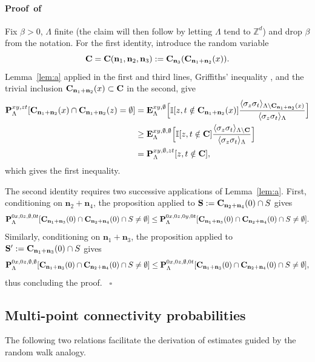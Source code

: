 \documentclass[a4paper,oneside,11pt]{article}
\def\Z{\mathbb{Z}}                          %
\newcommand{\be}[1]{\begin{equation}\label{#1}}
\newcommand{\ee}{\end{equation}}
\numberwithin{equation}{section}
\numberwithin{equation}{section}
\numberwithin{equation}{section}
\newenvironment{proof}[1][\relax]%
  {\paragraph{Proof\ifx#1\relax\else~of #1\fi}}%
  {~\hfill$\square$\par\bigskip}
\def\Z{\mathbb{Z}}                          %
\def\be{\begin{equation}}
\def\ee{\end{equation}}
\newcommand{\n}{\mathbf{n}}
\begin{document}
\begin{proof}
Fix $\beta>0$, $\Lambda$ finite (the claim will then follow by letting $\Lambda$ tend to $\Z^d$) and drop $\beta$ from the notation. For the first identity, introduce the random variable 
\be
{\bf C}={\bf C}(\n_1,\n_2,\n_3):={\bf C}_{\n_3}({\bf C}_{\n_1+\n_2}(x)).
\ee Lemma~\ref{lem:a} applied in the first and third lines, Griffiths' inequality \cite{Gri67}, and the trivial inclusion ${\bf C}_{\n_1+\n_2}(x)\subset{\bf C}$ in the second, give
\begin{align}{\bf P}^{xy,zt}_\Lambda[{\bf C}_{\n_1+\n_2}(x)\cap{\bf C}_{\n_1+\n_2}(z)= \emptyset]&={\bf E}^{xy,\emptyset}_\Lambda\Big[\mathbb I[z,t\notin {\bf C}_{\n_1+\n_2}(x)]\frac{\langle\sigma_z\sigma_t\rangle_{\Lambda\setminus{\bf C}_{\n_1+\n_2}(x)}}{\langle\sigma_z\sigma_t\rangle_\Lambda}\Big]\nonumber\\
&\ge{\bf E}^{xy,\emptyset,\emptyset}_\Lambda\Big[\mathbb I[z,t\notin {\bf C}]\frac{\langle\sigma_z\sigma_t\rangle_{\Lambda\setminus {\bf C}}}{\langle\sigma_z\sigma_t\rangle_\Lambda}\Big]\nonumber\\
&={\bf P}^{xy,\emptyset,zt}_\Lambda[z,t\notin {\bf C}],\end{align}
which gives the first inequality.

The second identity requires two successive applications of Lemma~\ref{lem:a}. First, conditioning on $\n_2+\n_4$, the proposition applied to $\mathbf S:={\bf C}_{\n_2+\n_4}(0)\cap S$ gives
\be
{\bf P}^{0x,0z,\emptyset,0t}_\Lambda[{\bf C}_{\n_1+\n_3}(0)\cap{\bf C}_{\n_2+\n_4}(0)\cap S\ne \emptyset]\le {\bf P}^{0x,0z,0y,0t}_\Lambda[{\bf C}_{\n_1+\n_3}(0)\cap{\bf C}_{\n_2+\n_4}(0)\cap S\ne \emptyset].\ee
Similarly, conditioning on $\n_1+\n_3$, the proposition applied to $\mathbf S':={\bf C}_{\n_1+\n_3}(0)\cap S$ gives
\be{\bf P}^{0x,0z,\emptyset,\emptyset}_\Lambda[{\bf C}_{\n_1+\n_3}(0)\cap{\bf C}_{\n_2+\n_4}(0)\cap S\ne\emptyset]\le {\bf P}^{0x,0z,\emptyset,0t}_\Lambda[{\bf C}_{\n_1+\n_3}(0)\cap{\bf C}_{\n_2+\n_4}(0)\cap S\ne\emptyset],\ee
thus concluding the proof.
\end{proof}

\subsection{Multi-point connectivity probabilities}
The following two relations facilitate the derivation of estimates guided by the random walk analogy.  
\end{document}

